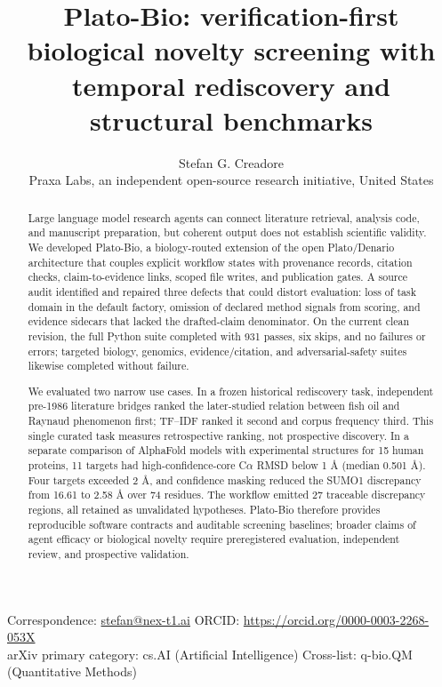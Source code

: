 \documentclass[11pt]{article}
\title{Plato-Bio: verification-first biological novelty screening with temporal rediscovery and structural benchmarks}
\author{Stefan G. Creadore\\\small Praxa Labs, an independent open-source research initiative, United States}
\date{}
\begin{document}
\maketitle

\begin{center}\small Correspondence: \href{mailto:stefan@nex-t1.ai}{stefan@nex-t1.ai} \quad ORCID: \url{https://orcid.org/0000-0003-2268-053X}\\arXiv primary category: cs.AI (Artificial Intelligence) \quad Cross-list: q-bio.QM (Quantitative Methods)\end{center}

\begin{abstract}

Large language model research agents can connect literature retrieval, analysis code, and manuscript preparation, but coherent output does not establish scientific validity. We developed Plato-Bio, a biology-routed extension of the open Plato/Denario architecture that couples explicit workflow states with provenance records, citation checks, claim-to-evidence links, scoped file writes, and publication gates. A source audit identified and repaired three defects that could distort evaluation: loss of task domain in the default factory, omission of declared method signals from scoring, and evidence sidecars that lacked the drafted-claim denominator. On the current clean revision, the full Python suite completed with 931 passes, six skips, and no failures or errors; targeted biology, genomics, evidence/citation, and adversarial-safety suites likewise completed without failure.

We evaluated two narrow use cases. In a frozen historical rediscovery task, independent pre-1986 literature bridges ranked the later-studied relation between fish oil and Raynaud phenomenon first; TF--IDF ranked it second and corpus frequency third. This single curated task measures retrospective ranking, not prospective discovery. In a separate comparison of AlphaFold models with experimental structures for 15 human proteins, 11 targets had high-confidence-core C$\alpha$ RMSD below 1 \AA{} (median 0.501 \AA{}). Four targets exceeded 2 \AA{}, and confidence masking reduced the SUMO1 discrepancy from 16.61 to 2.58 \AA{} over 74 residues. The workflow emitted 27 traceable discrepancy regions, all retained as unvalidated hypotheses. Plato-Bio therefore provides reproducible software contracts and auditable screening baselines; broader claims of agent efficacy or biological novelty require preregistered evaluation, independent review, and prospective validation.

\end{abstract}
\end{document}

